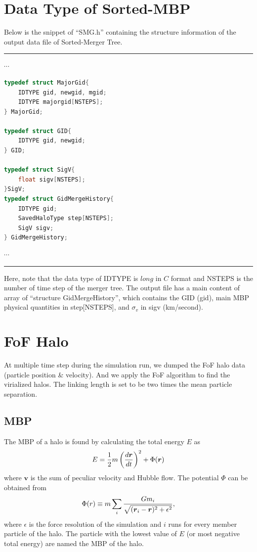 \documentclass[openleft]{memoir}
\begin{document}
\section{Data Type of Sorted-MBP}

Below is the snippet of ``SMG.h'' containing the structure information of the output data file of Sorted-Merger Tree.

\noindent\rule{\textwidth}{1pt}
$\cdots$
\begin{lstlisting}[language=c]
typedef struct MajorGid{
    IDTYPE gid, newgid, mgid;
    IDTYPE majorgid[NSTEPS];
} MajorGid;

typedef struct GID{
    IDTYPE gid, newgid;
} GID;

typedef struct SigV{
    float sigv[NSTEPS];
}SigV;
typedef struct GidMergeHistory{
    IDTYPE gid;
    SavedHaloType step[NSTEPS];
    SigV sigv;
} GidMergeHistory;
\end{lstlisting}
$\cdots$

\noindent\rule{\textwidth}{1pt}

Here, note that the data type of IDTYPE is $long$ in $C$ format and NSTEPS is the number of time step of the merger tree.
The output file has a main content of array of ``structure GidMergeHistory'', which contains the GID (gid),
main MBP physical quantities in step[NSTEPS], and $\sigma_v$ in sigv (km/second).

\section{FoF Halo}
At multiple time step during the simulation run, we dumped the FoF halo data (particle position \& velocity).
And we apply the FoF algorithm to find the virialized halos. The linking length is set to be two times the mean
particle separation.
\subsection{MBP}
The MBP of a halo is found by calculating the total energy $E$ as
\begin{equation}
E = {1\over2} m \left({d \boldsymbol{r} \over dt}\right)^2 + \Phi(\boldsymbol{r})
\end{equation}
where $\boldsymbol{v}$ is the sum of peculiar velocity and Hubble flow.
The potential $\Phi$ can be obtained from
\begin{equation}
\Phi(r) \equiv m\sum_i {Gm_i\over \sqrt{ (\boldsymbol{r}_i - \boldsymbol{r})^2 + \epsilon^2}},
\end{equation}
where $\epsilon$ is the force resolution of the simulation and $i$ runs for every member particle of the halo.
The particle with the lowest value of $E$ (or most negative total energy) are named the MBP of the halo.
\end{document}
